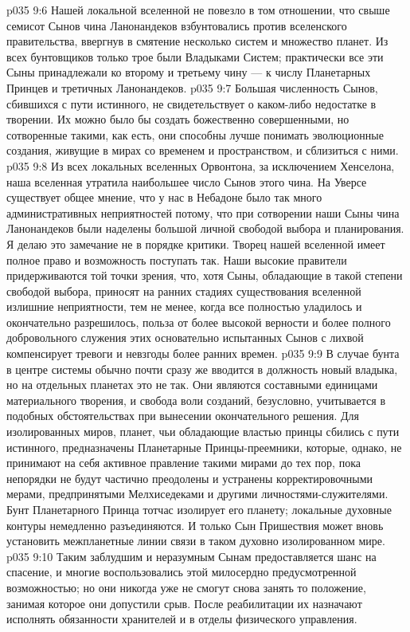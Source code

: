 \vs p035 9:6 Нашей локальной вселенной не повезло в том отношении, что свыше семисот Сынов чина Ланонандеков взбунтовались против вселенского правительства, ввергнув в смятение несколько систем и множество планет. Из всех бунтовщиков только трое были Владыками Систем; практически все эти Сыны принадлежали ко второму и третьему чину --- к числу Планетарных Принцев и третичных Ланонандеков.
\vs p035 9:7 Большая численность Сынов, сбившихся с пути истинного, не свидетельствует о каком\hyp{}либо недостатке в творении. Их можно было бы создать божественно совершенными, но сотворенные такими, как есть, они способны лучше понимать эволюционные создания, живущие в мирах со временем и пространством, и сблизиться с ними.
\vs p035 9:8 Из всех локальных вселенных Орвонтона, за исключением Хенселона, наша вселенная утратила наибольшее число Сынов этого чина. На Уверсе существует общее мнение, что у нас в Небадоне было так много административных неприятностей потому, что при сотворении наши Сыны чина Ланонандеков были наделены большой личной свободой выбора и планирования. Я делаю это замечание не в порядке критики. Творец нашей вселенной имеет полное право и возможность поступать так. Наши высокие правители придерживаются той точки зрения, что, хотя Сыны, обладающие в такой степени свободой выбора, приносят на ранних стадиях существования вселенной излишние неприятности, тем не менее, когда все полностью уладилось и окончательно разрешилось, польза от более высокой верности и более полного добровольного служения этих основательно испытанных Сынов с лихвой компенсирует тревоги и невзгоды более ранних времен.
\vs p035 9:9 \pc В случае бунта в центре системы обычно почти сразу же вводится в должность новый владыка, но на отдельных планетах это не так. Они являются составными единицами материального творения, и свобода воли созданий, безусловно, учитывается в подобных обстоятельствах при вынесении окончательного решения. Для изолированных миров, планет, чьи обладающие властью принцы сбились с пути истинного, предназначены Планетарные Принцы\hyp{}преемники, которые, однако, не принимают на себя активное правление такими мирами до тех пор, пока непорядки не будут частично преодолены и устранены корректировочными мерами, предпринятыми Мелхиседеками и другими личностями\hyp{}служителями. Бунт Планетарного Принца тотчас изолирует его планету; локальные духовные контуры немедленно разъединяются. И только Сын Пришествия может вновь установить межпланетные линии связи в таком духовно изолированном мире.
\vs p035 9:10 Таким заблудшим и неразумным Сынам предоставляется шанс на спасение, и многие воспользовались этой милосердно предусмотренной возможностью; но они никогда уже не смогут снова занять то положение, занимая которое они допустили срыв. После реабилитации их назначают исполнять обязанности хранителей и в отделы физического управления.
